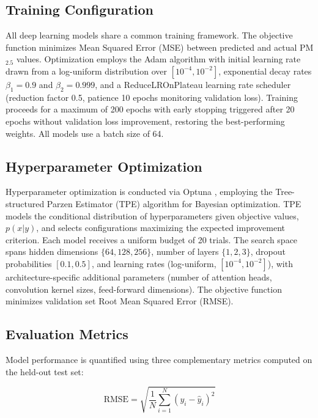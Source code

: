 \documentclass[conference]{IEEEtran}
\begin{document}
\subsection{Training Configuration}

All deep learning models share a common training framework. The objective function minimizes Mean Squared Error (MSE) between predicted and actual PM$_{2.5}$ values. Optimization employs the Adam algorithm \cite{kingma2015} with initial learning rate drawn from a log-uniform distribution over $[10^{-4}, 10^{-2}]$, exponential decay rates $\beta_1 = 0.9$ and $\beta_2 = 0.999$, and a ReduceLROnPlateau learning rate scheduler (reduction factor 0.5, patience 10 epochs monitoring validation loss). Training proceeds for a maximum of 200 epochs with early stopping triggered after 20 epochs without validation loss improvement, restoring the best-performing weights. All models use a batch size of 64.

\subsection{Hyperparameter Optimization}

Hyperparameter optimization is conducted via Optuna \cite{akiba2019}, employing the Tree-structured Parzen Estimator (TPE) algorithm for Bayesian optimization. TPE models the conditional distribution of hyperparameters given objective values, $p(x|y)$, and selects configurations maximizing the expected improvement criterion. Each model receives a uniform budget of 20 trials. The search space spans hidden dimensions $\{64, 128, 256\}$, number of layers $\{1, 2, 3\}$, dropout probabilities $[0.1, 0.5]$, and learning rates (log-uniform, $[10^{-4}, 10^{-2}]$), with architecture-specific additional parameters (number of attention heads, convolution kernel sizes, feed-forward dimensions). The objective function minimizes validation set Root Mean Squared Error (RMSE).

\subsection{Evaluation Metrics}

Model performance is quantified using three complementary metrics computed on the held-out test set:

\begin{equation}
\text{RMSE} = \sqrt{\frac{1}{N}\sum_{i=1}^{N}(y_i - \hat{y}_i)^2}
\label{eq:rmse}
\end{equation}
\end{document}

